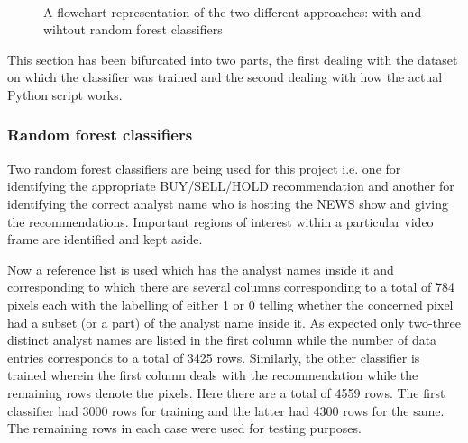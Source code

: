 \begin{figure}[h]
 \centering
  \\
 \vspace{1.5cm}
 \caption{A flowchart representation of the two different approaches: with and wihtout random forest classifiers}
 \label{fig:not_rf_and_rf}
\end{figure}

This section has been bifurcated into two parts, the first dealing with the dataset on which the classifier was trained and the second dealing with how the actual Python script works.

\subsubsection{Random forest classifiers}
Two random forest classifiers are being used for this project i.e. one for identifying the appropriate BUY/SELL/HOLD recommendation and another for identifying the correct analyst name who is hosting the NEWS show and giving the recommendations. Important regions of interest within a particular video frame are identified and kept aside. \par

Now a reference list is used which has the analyst names inside it and corresponding to which there are several columns corresponding to a total of 784 pixels each with the labelling of either 1 or 0 telling whether the concerned pixel had a subset (or a part) of the analyst name inside it. As expected only two-three distinct analyst names are listed in the first column while the number of data entries corresponds to a total of 3425 rows. Similarly, the other classifier is trained wherein the first column deals with the recommendation while the remaining rows denote the pixels. Here there are a total of 4559 rows. The first classifier had 3000 rows for training and the latter had 4300 rows for the same. The remaining rows in each case were used for testing purposes. \par

